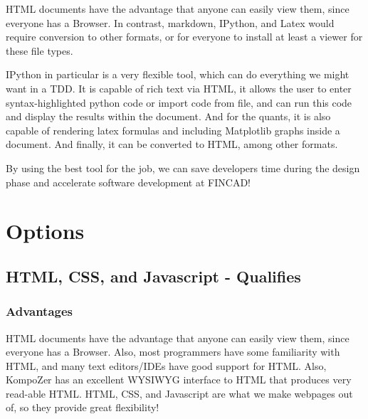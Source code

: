 \documentclass[]{article}
\begin{document}
HTML documents have the advantage that anyone can easily view them, since everyone has a Browser.  In contrast, markdown, IPython, and Latex would require conversion to other formats, or for everyone to install at least a viewer for these file types.

IPython in particular is a very flexible tool, which can do everything we might want in a TDD.  It is capable of rich text via HTML, it allows the user to enter syntax-highlighted python code or import code from file, and can run this code and display the results within the document.  And for the quants, it is also capable of rendering latex formulas and including Matplotlib graphs inside a document.  And finally, it can be converted to HTML, among other formats.

By using the best tool for the job, we can save developers time during the design phase and accelerate software development at FINCAD!

\section{Options}

\subsection{HTML, CSS, and Javascript - Qualifies}
	\subsubsection{Advantages}
		HTML documents have the advantage that anyone can easily view them, since everyone has a Browser.  Also, most programmers have some familiarity with HTML, and many text editors/IDEs have good support for HTML.  Also, KompoZer has an excellent WYSIWYG interface to HTML that produces very read-able HTML.  HTML, CSS, and Javascript are what we make webpages out of, so they provide great flexibility!
\end{document}
